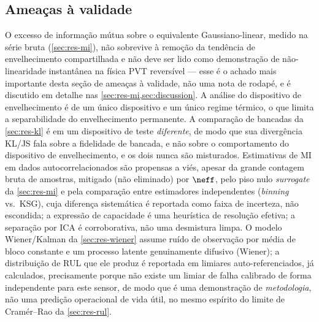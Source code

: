 \subsection{Ameaças à validade}
O excesso de informação mútua sobre o equivalente Gaussiano-linear, medido
na série bruta (\cref{sec:res-mi}), não sobrevive à remoção da tendência de
envelhecimento compartilhada e não deve ser lido como demonstração de
não-linearidade instantânea na física PVT reversível --- esse é o achado
mais importante desta seção de ameaças à validade, não uma nota de rodapé,
e é discutido em detalhe nas \cref{sec:res-mi,sec:discussion}. A análise do
dispositivo de envelhecimento é de um único dispositivo e um
único regime térmico, o que limita a separabilidade do envelhecimento
permanente. A comparação de bancadas da \cref{sec:res-kl} é em um
dispositivo de teste \emph{diferente}, de modo que sua divergência KL/JS
fala sobre a fidelidade de bancada, e não sobre o comportamento do
dispositivo de envelhecimento, e os dois nunca são misturados. Estimativas
de MI em dados autocorrelacionados são propensas a viés, apesar da grande
contagem bruta de amostras, mitigado (não eliminado) por $\neff$, pelo piso
nulo \emph{surrogate} da \cref{sec:res-mi} e pela comparação entre
estimadores independentes (\emph{binning} vs.\ KSG), cuja diferença
sistemática é reportada como faixa de incerteza, não escondida; a
expressão de capacidade é uma heurística de resolução
efetiva; a separação por ICA é corroborativa, não uma desmistura limpa. O
modelo Wiener/Kalman da \cref{sec:res-wiener} assume ruído de observação por
média de bloco constante e um processo latente genuinamente difusivo
(Wiener); a distribuição de RUL que ele produz é reportada em limiares
auto-referenciados, já calculados, precisamente porque não existe um limiar
de falha calibrado de forma independente para este sensor, de modo que é
uma demonstração de \emph{metodologia}, não uma predição operacional de
vida útil, no mesmo espírito do limite de Cram\'er--Rao da
\cref{sec:res-rul}.
